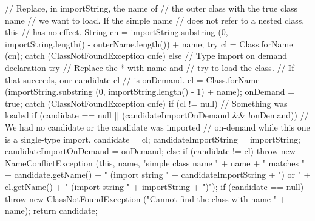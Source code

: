 \begin{code}
\begin{hide}
{{{{               // Replace, in importString, the name of
               // the outer class with the true class name
               // we want to load.  If the simple name
               // does not refer to a nested class, this
               // has no effect.
               String cn = importString.substring
                  (0, importString.length() - outerName.length()) + name;
               try {
                  cl = Class.forName (cn);
               }
               catch (ClassNotFoundException cnfe) {}
            }
         }
         else {
            // Type import on demand declaration
            try {
               // Replace the * with name and
               // try to load the class.
               // If that succeeds, our candidate cl
               // is onDemand.
               cl = Class.forName
                  (importString.substring (0, importString.length() - 1) + name);
               onDemand = true;
            }
            catch (ClassNotFoundException cnfe) {}
         }
         if (cl != null) {
            // Something was loaded
            if (candidate == null ||
                (candidateImportOnDemand && !onDemand)) {
               // We had no candidate or the candidate was imported
               // on-demand while this one is a single-type import.
               candidate = cl;
               candidateImportString = importString;
               candidateImportOnDemand = onDemand;
            }
            else if (candidate != cl)
               throw new NameConflictException
                  (this, name,
                   "simple class name " + name +
                   " matches " + candidate.getName() +
                   " (import string " + candidateImportString + ") or " +
                   cl.getName() + " (import string " + importString + ")");
         }
      }
      if (candidate == null)
         throw new ClassNotFoundException
            ("Cannot find the class with name " + name);
      return candidate;
   }\end{hide}
\end{code}
